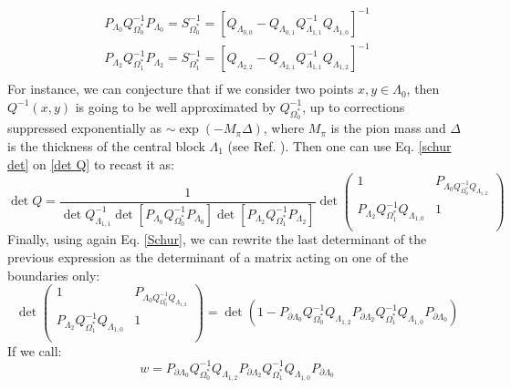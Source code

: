 \begin{equation}
    \begin{split}
        P_{\Lambda_0} Q^{-1}_{\Omega^*_0} P_{\Lambda_0} = S_{\Omega^*_0}^{-1} = \left[ Q_{\Lambda_{0,0}} - Q_{\Lambda_{0,1}}Q^{-1}_{\Lambda_{1,1}}Q_{\Lambda_{1,0}}  \right]^{-1} \\
        P_{\Lambda_2} Q^{-1}_{\Omega^*_1} P_{\Lambda_2} = S_{\Omega^*_1}^{-1} = \left[ Q_{\Lambda_{2,2}} - Q_{\Lambda_{2,1}}Q^{-1}_{\Lambda_{1,1}}Q_{\Lambda_{1,2}}  \right]^{-1} \\
    \end{split}
\end{equation}
For instance, we can conjecture that if we consider two points $x, y \in \Lambda_0$, then $Q^{-1}(x,y)$ is going to be well approximated by $Q_{\Omega_0^*}^{-1}$, up to corrections suppressed exponentially as $\sim\exp(-M_{\pi} \Delta)$, where $M_\pi$ is the pion mass and $\Delta$ is the thickness of the central block $\Lambda_1$ (see Ref. \cite{C__2016}). Then one can use Eq. \eqref{schur det} on \eqref{det Q} to recast it as:
\begin{equation}
    \det Q = \frac{1}{\det Q_{\Lambda_{1,1}}^{-1} \det \left[ P_{\Lambda_0} Q^{-1}_{\Omega^*_0} P_{\Lambda_0} \right] \det \left[ P_{\Lambda_2} Q^{-1}_{\Omega^*_1} P_{\Lambda_2}  \right] } \det \begin{pmatrix}
        1 & P_{\Lambda_0 Q_{\Omega^*_{0}}^{-1} Q_{\Lambda_{1,2}}} \\ 
        P_{\Lambda_2} Q_{\Omega_1^*}^{-1} Q_{\Lambda_{1,0}} & 1 \\
    \end{pmatrix}
\end{equation}
Finally, using again Eq. \eqref{Schur}, we can rewrite the last determinant of the previous expression as the determinant of a matrix acting on one of the boundaries only:
\begin{equation}\label{final det}
    \det \begin{pmatrix}
        1 & P_{\Lambda_0 Q_{\Omega^*_{0}}^{-1} Q_{\Lambda_{1,2}}} \\ 
        P_{\Lambda_2} Q_{\Omega_1^*}^{-1} Q_{\Lambda_{1,0}} & 1 \\
    \end{pmatrix} = \det \left(1 - P_{\partial \Lambda_0} Q_{\Omega_0^*}^{-1} Q_{\Lambda_{1,2}} P_{\partial \Lambda_2} Q_{\Omega_1^{*}}^{-1} Q_{\Lambda_{1,0}} P_{\partial \Lambda_0} \right)
\end{equation}
If we call:
\begin{equation}\label{w}
  w =  P_{\partial \Lambda_0} Q_{\Omega_0^*}^{-1} Q_{\Lambda_{1,2}} P_{\partial \Lambda_2} Q_{\Omega_1^{*}}^{-1} Q_{\Lambda_{1,0}} P_{\partial \Lambda_0}
\end{equation}
